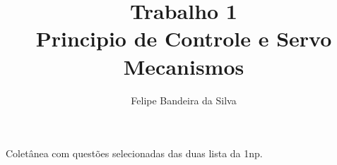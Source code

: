 \documentclass[paper=a4, fontsize=11pt]{article}
\title{Trabalho 1\\Principio de Controle e Servo Mecanismos}
\author{Felipe Bandeira da Silva}
\begin{document}
\maketitle

Coletânea com questões selecionadas das duas lista da 1np.

\newpage

\listoffigures

\newpage
\end{document}
